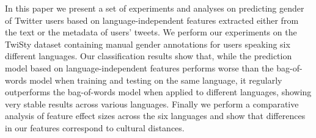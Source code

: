 In this paper we present a set of experiments and analyses on predicting gender of Twitter users based on language-independent features extracted either from the text or the metadata of users' tweets. We perform our experiments on the TwiSty dataset containing manual gender annotations for users speaking six different languages. Our classification results show that, while the prediction model based on language-independent features performs worse than the bag-of-words model when training and testing on the same language, it regularly outperforms the bag-of-words model when applied to different languages, showing very stable results across various languages. Finally we perform a comparative analysis of feature effect sizes across the six languages and show that differences in our features correspond to cultural distances.
